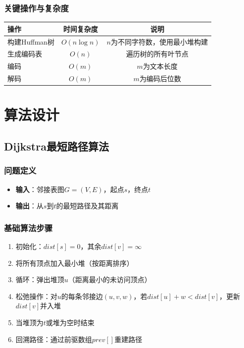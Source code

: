 \documentclass[12pt,a4paper]{report}
\begin{document}
\subsection{关键操作与复杂度}

\begin{table}[H]
\centering
\begin{tabular}{lcc}
\toprule
\textbf{操作} & \textbf{时间复杂度} & \textbf{说明} \\
\midrule
构建Huffman树 & $O(n \log n)$ & $n$为不同字符数，使用最小堆构建 \\
生成编码表 & $O(n)$ & 遍历树的所有叶节点 \\
编码 & $O(m)$ & $m$为文本长度 \\
解码 & $O(m)$ & $m$为编码后位数 \\
\bottomrule
\end{tabular}
\end{table}


\chapter{算法设计}

\section{Dijkstra最短路径算法}

\subsection{问题定义}

\begin{itemize}
    \item \textbf{输入}：邻接表图$G=(V,E)$，起点$s$，终点$t$
    \item \textbf{输出}：从$s$到$t$的最短路径及其距离
\end{itemize}

\subsection{基础算法步骤}

\begin{enumerate}
    \item 初始化：$dist[s] = 0$，其余$dist[v] = \infty$
    \item 将所有顶点加入最小堆（按距离排序）
    \item 循环：弹出堆顶$u$（距离最小的未访问顶点）
    \item 松弛操作：对$u$的每条邻接边$(u, v, w)$，若$dist[u] + w < dist[v]$，更新$dist[v]$并入堆
    \item 当堆顶为$t$或堆为空时结束
    \item 回溯路径：通过前驱数组$prev[]$重建路径
\end{enumerate}
\end{document}
